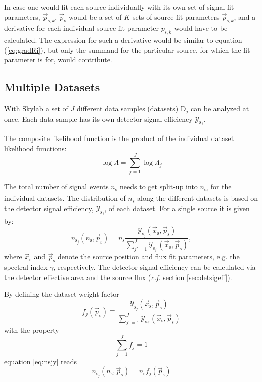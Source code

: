 \documentclass{article}
\newcommand{\ns}{n_{\mathrm{s}}}
\newcommand{\ps}{\vec{p}_{\mathrm{s}}}
\newcommand{\xs}{\vec{x}_{\mathrm{s}}}
\begin{document}
In case one would fit each source individually with its own set of signal fit
parameters, $\vec{p}_{\mathrm{s},k}$, $\ps$ would be a set of $K$ sets
of source fit parameters $\vec{p}_{\mathrm{s},k}$, and a derivative for each
individual source fit parameter $p_{\mathrm{s},k}$ would have to be calculated.
The expression for such a derivative would be similar to equation (\ref{eq:gradRi}),
but only the summand for the particular source, for which the fit parameter is for, would
contribute.


\subsection{Multiple Datasets}

With Skylab a set of $J$ different data samples (datasets) $\mathrm{D}_j$ can be
analyzed at once. Each data sample has its own detector signal efficiency
$\mathcal{Y}_{\mathrm{s}_j}$.

The composite likelihood function is the product of the individual dataset
likelihood functions:
\begin{equation}
 \log \Lambda = \sum_{j=1}^{J} \log \Lambda_j
 \label{eq:logLambdaComposite}
\end{equation}

The total number of signal events $\ns$ needs to get split-up into
$n_{\mathrm{s}_j}$ for the individual datasets. The distribution of $\ns$
along the different datasets is based on the detector signal efficiency,
$\mathcal{Y}_{\mathrm{s}_j}$, of each dataset. For a single source it is given by:
\begin{equation}
 n_{\mathrm{s}_j}(\ns,\ps) = \ns \frac{\mathcal{Y}_{\mathrm{s}_j}(\xs,\ps)}{\sum_{j'=1}^{J} \mathcal{Y}_{\mathrm{s}_{j'}}(\xs,\ps)},
 \label{eq:nsjy}
\end{equation}
where $\xs$ and $\ps$ denote the source position and flux fit parameters, e.g.
the spectral index $\gamma$, respectively. The detector signal efficiency can be
calculated via the detector effective area and the source flux (\emph{c.f.} section
\ref{sec:detsigeff}).

By defining the dataset weight factor
\begin{equation}
 f_j(\ps) \equiv \frac{\mathcal{Y}_{\mathrm{s}_j}(\xs,\ps)}{\sum_{j'=1}^{J} \mathcal{Y}_{\mathrm{s}_{j'}}(\xs,\ps)}
 \label{eq:dataset-weight-factor-single-source}
\end{equation}
with the property
\begin{equation}
 \sum_{j=1}^{J} f_j = 1
\end{equation}
equation \ref{eq:nsjy} reads
\begin{equation}
 n_{\mathrm{s}_j}(\ns,\ps) = \ns f_{j}(\ps)
 \label{eq:ns-sample-weight-factor}
\end{equation}
\end{document}
